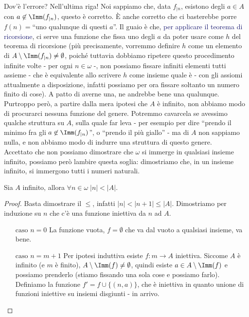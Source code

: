 Dov'è l'errore? Nell'ultima riga! Noi sappiamo che, data $f_{|n}$, esistono degli $a \in A$ con $a \not\in\Imm(f_{|n})$, questo è corretto. È anche corretto che ci basterebbe porre $f(n) =$``uno qualunque di questi $a$''.
Il guaio è che, \textcolor{MidnightBlue}{per applicare il teorema di ricorsione}, ci serve una funzione che fissa uno degli $a$ da poter usare come $h$ del teorema di ricorsione (più precisamente, vorremmo definire $h$ come un elemento di $A \setminus \Imm(f_{|n}) \ne \emptyset$, poiché tuttavia dobbiamo ripetere questo procedimento infinite volte - per ogni $n \in \omega$ -,
non possiamo fissare infiniti elementi tutti assieme - che è equivalente allo scrivere $h$ come insieme quale è - con gli assiomi attualmente a disposizione, infatti possiamo per ora fissare soltanto un numero finito di cose).
A patto di averne una, ne andrebbe bene una qualunque.\\ Purtroppo però, a partire dalla mera ipotesi che $A$ è infinito, non abbiamo modo di procurarci nessuna funzione del genere. Potremmo cavarcela se avessimo qualche struttura su $A$, sulla quale far leva - per esempio per dire ``prendo il minimo 
fra gli $a \not\in \Imm(f_{|n})$'', o ``prendo il più giallo'' - ma di $A$ non sappiamo nulla, e non abbiamo modo di indurre una struttura di questo genere.\\
Accettato che non possiamo dimostrare che $\omega$ si immerge in qualsiasi insieme infinito, possiamo però lambire questa soglia: dimostriamo che, in un insieme infinito, si immergono tutti i numeri naturali.

\begin{proposition}
	Sia $A$ infinito, allora $\forall n\in \omega \; |n| < |A|$.
\end{proposition}

\begin{proof}
	Basta dimostrare il $\leq$, infatti $|n| < |n+1| \leq |A|$. Dimostriamo per induzione su $n$ che c'è una funzione iniettiva da $n$ ad $A$.
	\begin{itemize}
		\item[$\boxed{\text{caso $n = 0$}}$] La funzione vuota, $f = \emptyset$ che va dal vuoto a qualsiasi insieme, va bene.
		\item[$\boxed{\text{caso $n = m+1$}}$] Per ipotesi induttiva esiste $f : m \rightarrow A$ iniettiva. Siccome $A$ è infinito (e $m$ è finito), $A \setminus \Imm(f) \ne \emptyset$, quindi esiste $a \in A \setminus \Imm(f)$ e possiamo prenderlo (stiamo fissando una sola cose e possiamo farlo).
		Definiamo la funzione $f' = f \cup \{(n,a)\}$, che è iniettiva in quanto unione di funzioni iniettive su insiemi disgiunti - in arrivo.
	\end{itemize}
\end{proof}

